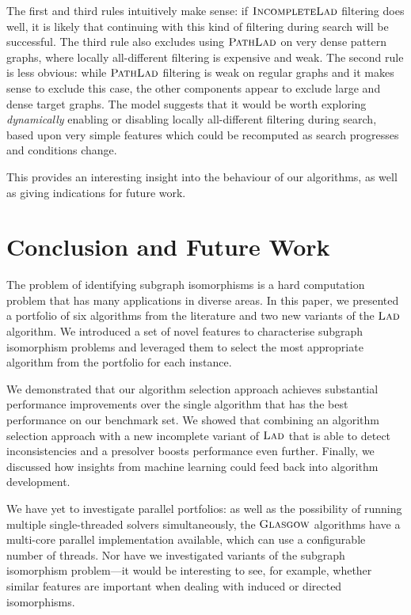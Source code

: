 \documentclass{llncs}
\newcommand{\Glasgow}{$\textsc{Glasgow}$\xspace}
\newcommand{\LAD}{$\textsc{Lad}$\xspace}
\newcommand{\IncompleteLAD}{$\textsc{IncompleteLad}$\xspace}
\newcommand{\PathLAD}{$\textsc{PathLad}$\xspace}
\begin{document}
\noindent
The first and third rules intuitively make sense: if \IncompleteLAD
filtering does well, it is likely that continuing with this kind of filtering
during search will be successful. The third rule also excludes using \PathLAD
on very dense pattern graphs, where locally all-different filtering is
expensive and weak. The second rule is less obvious: while \PathLAD filtering is
weak on regular graphs and it makes sense to exclude this case, the other
components appear to exclude large and dense target graphs. The model suggests
that it would be worth exploring \emph{dynamically} enabling or disabling
locally all-different filtering during search, based upon very simple features
which could be recomputed as search progresses and conditions change.

This provides an interesting insight into the behaviour of our algorithms, as
well as giving indications for future work.

\section{Conclusion and Future Work}\label{sec:concs}

The problem of identifying subgraph isomorphisms is a hard computation problem that has many
applications in diverse areas. In this paper, we presented a portfolio of six algorithms from the
literature and two new variants of the \LAD algorithm. We introduced a set of novel features to
characterise subgraph isomorphism problems and leveraged them to select the most appropriate
algorithm from the portfolio for each instance.

We demonstrated that our algorithm selection approach achieves substantial
performance improvements over the single algorithm that has the best performance
on our benchmark set. We showed that combining an algorithm selection approach
with a new incomplete variant of \LAD that is able to detect inconsistencies
and a presolver boosts performance even further. Finally, we discussed how
insights from machine learning could feed back into algorithm development.

We have yet to investigate parallel portfolios: as well as the possibility of
running multiple single-threaded solvers simultaneously, the \Glasgow
algorithms have a multi-core parallel implementation available, which can use a
configurable number of threads. Nor have we investigated variants of the
subgraph isomorphism problem---it would be interesting to see, for example,
whether similar features are important when dealing with induced or directed
isomorphisms.



\end{document}
